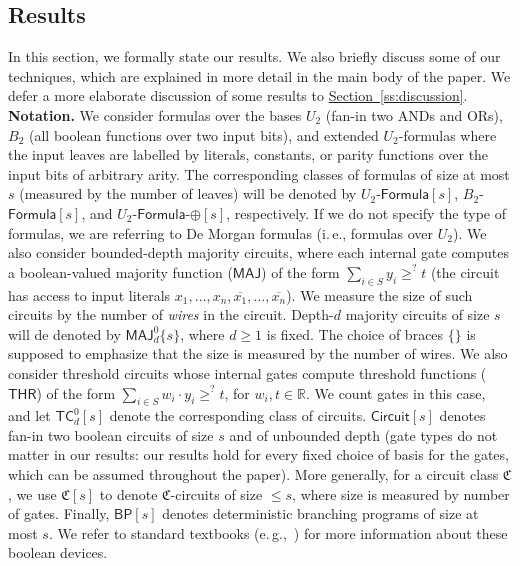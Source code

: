 \documentclass[11pt]{article}
\numberwithin{equation}{section}
\theoremstyle{definition}
\theoremstyle{plain}
\newcommand{\ie}{i.\,e.}
\newcommand{\eg}{e.\,g.}
\newcommand{\expref}[2]{\hyperref[#2]{#1~\ref{#2}}}
\begin{document}
\subsection{Results}\label{ss:results}

In this section, we formally state our results. We also briefly discuss some of our techniques, which are explained in more detail in the main body of the paper. We defer a more elaborate discussion of some results to \expref{Section}{ss:discussion}.\\

\noindent \textbf{Notation.} We consider formulas over the bases $U_2$ (fan-in two ANDs and ORs), $B_2$ (all boolean functions over two input bits), and extended $U_2$-formulas where the input leaves are labelled by literals, constants, or parity functions over the input bits of arbitrary arity. The corresponding classes of formulas of size at most $s$ (measured by the number of leaves) will be denoted by $U_2$-$\mathsf{Formula}[s]$, $B_2$-$\mathsf{Formula}[s]$, and $U_2$-$\mathsf{Formula}$-$\oplus[s]$, respectively. If we do not specify the type of formulas, we are referring to De Morgan formulas (\ie, formulas over $U_2$). We also consider bounded-depth majority circuits, where each internal gate computes a boolean-valued majority function ($\mathsf{MAJ}$) of the form $\sum_{i \in S} y_i \geq^? t$ (the circuit has access to input literals $x_1, \ldots, x_n, \overline{x_1}, \ldots, \overline{x_n}$). We measure the size of such circuits by the number of \emph{wires} in the circuit. Depth-$d$ majority circuits of size $s$ will de denoted by $\mathsf{MAJ}^0_d\{s\}$, where $d\geq 1$ is fixed. The choice of %
braces  %
$\{\}$ is supposed to emphasize that the size is measured by the number of wires. We also consider threshold circuits whose
internal gates compute %
threshold functions  %
($\mathsf{THR}$) of the form $\sum_{i \in S} w_i \cdot y_i \geq^? t$, for $w_i, t \in \mathbb{R}$. We count %
gates in this case, and let $\mathsf{TC}^0_d[s]$ denote the corresponding class of circuits. $\mathsf{Circuit}[s]$ denotes fan-in two boolean circuits of size $s$ and of unbounded depth (gate types do not matter in our results: our results hold for every fixed choice of basis for the gates, which can be assumed throughout the paper). More generally, for a circuit class $\mathfrak{C}$, we use $\mathfrak{C}[s]$ to denote $\mathfrak{C}$-circuits of size $\leq s$, where size is measured by number of gates. Finally, $\mathsf{BP}[s]$ denotes deterministic branching programs of size at most $s$. We refer to
%
standard textbooks
%
(\eg,~\cite{DBLP:books/daglib/0028687})   %
for more information about these boolean devices.\\
\end{document}
